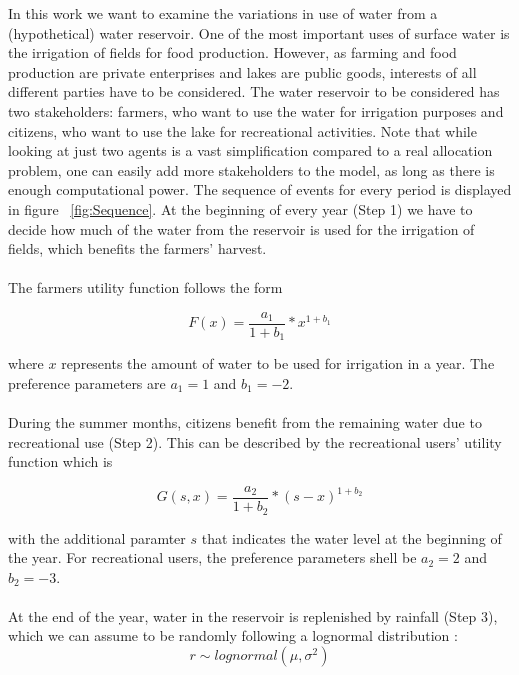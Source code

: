 \documentclass[12pt, a4paper, oneside]{article}
\begin{document}
In this work we want to examine the variations in use of water from a (hypothetical) water reservoir.
One of the most important uses of surface water is the irrigation of fields for food production. However, as farming and food production are private enterprises and lakes are public goods, interests of all different parties have to be considered.
The water reservoir to be considered has two stakeholders: farmers, who want to use the water for irrigation purposes and citizens, who want to use the lake for recreational activities.
Note that while looking at just two agents is a vast simplification compared to a real allocation problem, one can easily add more stakeholders to the model, as long as there is enough computational power.
The sequence of events for every period is displayed in figure ~\ref{fig:Sequence}.
At the beginning of every year (Step 1) we have to decide how much of the water from the reservoir is used for the irrigation of fields, which benefits the farmers' harvest.\\\\
The farmers utility function follows the form 

\begin{equation}
	F(x) = \frac{a_1}{1+b_1} * x^{1+b_1}
\end{equation}

where $x$ represents the amount of water to be used for irrigation in a year. The preference parameters are $a_1 = 1$ and $b_1 = -2$.\\\\

During the summer months, citizens benefit from the remaining water due to recreational use (Step 2).
This can be described by the recreational users' utility function which is

\begin{equation}
  G(s, x) = \frac{a_2}{1+b_2} * (s-x)^{1+b_2}
\end{equation}

with the additional paramter $s$ that indicates the water level at the beginning of the year.
For recreational users, the preference parameters shell be $a_2 = 2$ and $b_2 = -3$.\\\\

At the end of the year, water in the reservoir is replenished by rainfall (Step 3), which we can assume to be randomly following a lognormal distribution \citep{oosterbaan1994frequency}:
\begin{equation}
	r \sim lognormal(\mu, \sigma^2)
\end{equation}
\end{document}
